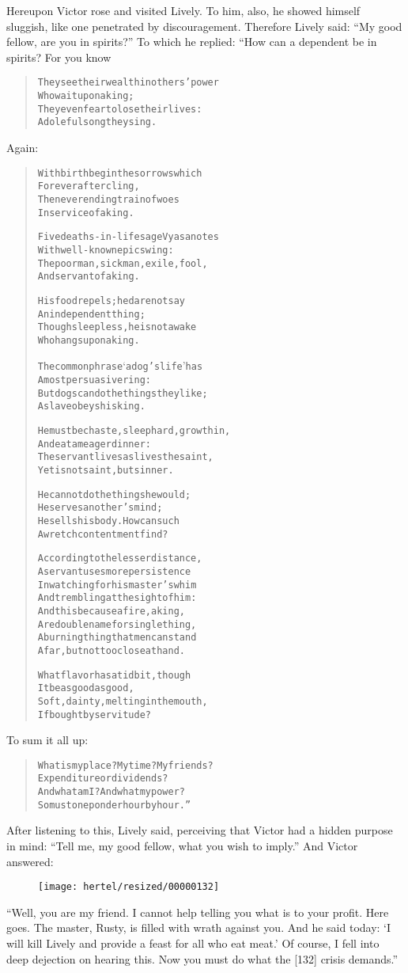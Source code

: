 \documentclass[article, twoside, 10pt]{memoir}
\renewenvironment{verbatim}{%
\begin{quote}%
\vskip -10pt%
\begin{alltt}\normalfont\small}{\end{alltt}%
\end{quote}%
\vskip -10pt
} %
\begin{document}
Hereupon Victor rose and visited Lively. To him, also, he showed
himself sluggish, like one penetrated by discouragement. Therefore
Lively said: ``My good fellow, are you in spirits?'' To which he
replied: “How can a dependent be in spirits? For you know

\begin{verbatim}
They see their wealth in others' power
    Who wait upon a king;
They even fear to lose their lives:
    A doleful song they sing.
\end{verbatim}
Again:

\begin{verbatim}
With birth begin the sorrows which
    Forever after cling,
The never ending train of woes
    In service of a king.

Five deaths-in-life sage Vyasa notes
    With well-known epic swing:
The poor man, sick man, exile, fool,
    And servant of a king.

His food repels; he dare not say
    An independent thing;
Though sleepless, he is not awake
    Who hangs upon a king.

The common phrase ‘a dog's life’ has
    A most persuasive ring:
But dogs can do the things they like;
    A slave obeys his king.

He must be chaste, sleep hard, grow thin,
    And eat a meager dinner:
The servant lives as lives the saint,
    Yet is not saint, but sinner.

He cannot do the things he would;
    He serves another's mind;
He sells his body. How can such
    A wretch contentment find?

According to the lesser distance,
A servant uses more persistence
In watching for his master's whim
And trembling at the sight of him:
And this because a fire, a king,
Are double name for single thing,
A burning thing that men can stand
Afar, but not too close at hand.

What flavor has a tidbit, though
    It be as good as good,
Soft, dainty, melting in the mouth,
    If bought by servitude?
\end{verbatim}
To sum it all up:

\begin{verbatim}
What is my place? My time? My friends?
Expenditure or dividends?
And what am I? And what my power?
So must one ponder hour by hour.”
\end{verbatim}
After listening to this, Lively said, perceiving that Victor had a
hidden purpose in mind:
``Tell me, my good fellow, what you wish to imply.'' And Victor
answered:
\begin{figure}[p]\texttt{[image: hertel/resized/00000132]}\end{figure}``Well, you are my friend. I cannot help telling you what is to your profit. Here goes. The master, Rusty, is filled with wrath against you. And he said today: `I will kill Lively and provide a feast for all who eat meat.' Of course, I fell into deep dejection on hearing this. Now you must do what the [132] crisis demands.''
\end{document}
